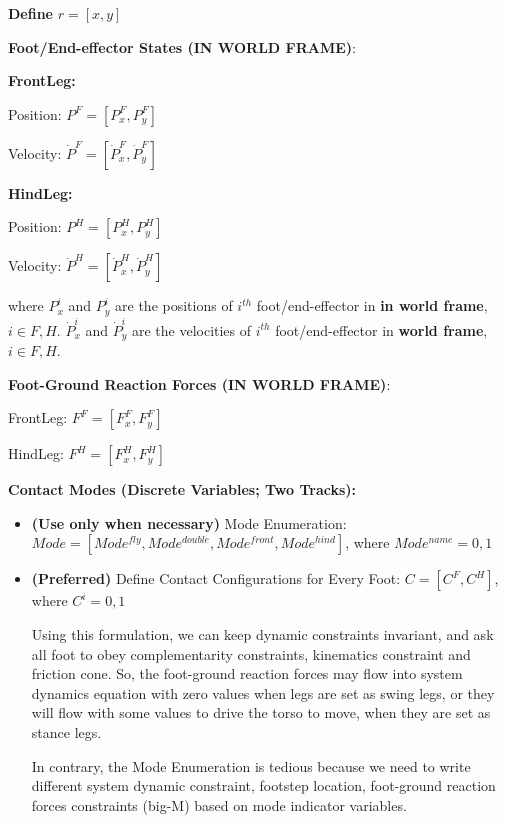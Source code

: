 \documentclass[a4paper,10pt]{article}
\begin{document}
\textbf{Define} $r = [x, y]$
\vspace{2mm}

\textbf{Foot/End-effector States (IN WORLD FRAME)}: 

\textbf{FrontLeg: }

Position: $P^F=[P^F_x,P^F_y]$

Velocity: $\dot{P}^F = [\dot{P}^F_x,\dot{P}^F_y]$

\vspace{2mm}

\textbf{HindLeg: }

Position: $P^H=[P^H_x, P^H_y]$

Velocity: $\dot{P}^H = [\dot{P}^H_x,\dot{P}^H_y]$
\vspace{2mm}

where $P^i_x$ and $P^i_y$ are the positions of $i^{th}$ foot/end-effector in \textbf{in world frame}, $i \in F, H$.
$\dot{P}^i_x$ and $\dot{P}^i_y$ are the velocities of $i^{th}$ foot/end-effector in \textbf{world frame}, $i \in F, H$.

\vspace{3mm}

\textbf{Foot-Ground Reaction Forces (IN WORLD FRAME)}:

FrontLeg: $F^F=[F^F_x,F^F_y]$

HindLeg: $F^H=[F^H_x,F^H_y]$
\vspace{2mm}

\textbf{Contact Modes (Discrete Variables; Two Tracks):}

\begin{itemize}
	\item \textbf{(Use only when necessary)} Mode Enumeration: $Mode = [Mode^{fly},Mode^{double},Mode^{front},Mode^{hind}]$, where $Mode^{name} = 0,1$
	
	\item \textbf{(Preferred)} Define Contact Configurations for Every Foot: $C = [C^F, C^H]$, where $C^i = 0,1$
	
	Using this formulation, we can keep dynamic constraints invariant, and ask all foot to obey complementarity constraints, kinematics constraint and friction cone. So, the foot-ground reaction forces may flow into system dynamics equation with zero values when legs are set as swing legs, or they will flow with some values to drive the torso to move, when they are set as stance legs.
	
	In contrary, the Mode Enumeration is tedious because we need to write different system dynamic constraint, footstep location, foot-ground reaction forces constraints (big-M) based on mode indicator variables.
	
\end{itemize}
\end{document}
